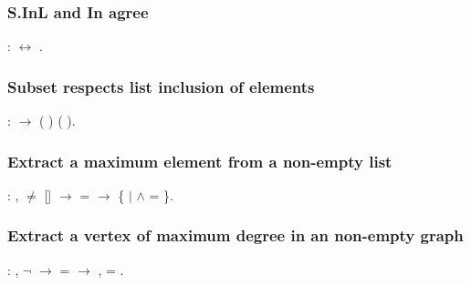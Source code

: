 \subsubsection{S.InL and In agree}


\begin{coqdoccode}
\coqdocemptyline
\coqdocnoindent
{}    :    \ensuremath{\leftrightarrow}   .\coqdoceol
\coqdocemptyline
\end{coqdoccode}
\subsubsection{Subset respects list inclusion of elements}


\begin{coqdoccode}
\coqdocemptyline
\coqdocnoindent
{}    :    \ensuremath{\rightarrow}  ( ) ( ).\coqdoceol
\coqdocemptyline
\end{coqdoccode}
\subsubsection{Extract a maximum element from a non-empty list}


\begin{coqdoccode}
\coqdocnoindent
{}  : \coqdockw{\ensuremath{\forall}}  ,  \ensuremath{\not=} [] \ensuremath{\rightarrow}   =  \ensuremath{\rightarrow} \{ \ensuremath{|}    \ensuremath{\land}  = \}.\coqdoceol
\coqdocemptyline
\end{coqdoccode}
\subsubsection{Extract a vertex of maximum degree in an non-empty graph}


\begin{coqdoccode}
\coqdocemptyline
\coqdocnoindent
{}  : \coqdockw{\ensuremath{\forall}}  , \ensuremath{\lnot}   \ensuremath{\rightarrow}   =  \ensuremath{\rightarrow} \coqdoctac{\ensuremath{\exists}} ,    =  .\coqdoceol
\coqdocemptyline
\end{coqdoccode}
